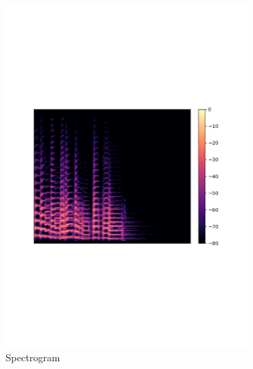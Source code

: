 \begin{figure}
     \centering
     \begin{subfigure}[b]{0.48\textwidth}
         \centering
         \includegraphics[width=\textwidth]{03-Theoretical Foundations/figures/spectrogram.pdf}
         \caption{Spectrogram}
         \label{fig:spectrogram}
     \end{subfigure}
     \hfill
     \begin{subfigure}[b]{0.48\textwidth}
         \centering

\end{subfigure}
\end{figure}
